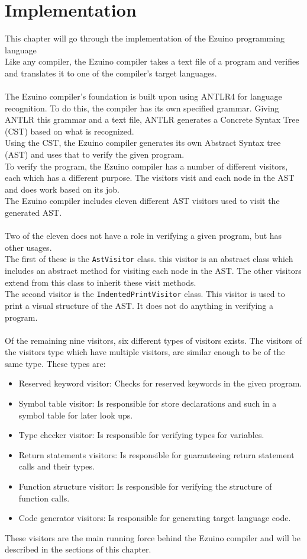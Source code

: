 \chapter{Implementation}
This chapter will go through the implementation of the Ezuino programming language\\
Like any compiler, the Ezuino compiler takes a text file of a program and verifies and translates it to one of the compiler’s target languages.
\\\\
The Ezuino compiler’s foundation is built upon using ANTLR4 for language recognition. To do this, the compiler has its own specified grammar. Giving ANTLR this grammar and a text file, ANTLR generates a Concrete Syntax Tree (CST) based on what is recognized.\\
Using the CST, the Ezuino compiler generates its own Abstract Syntax tree (AST) and uses that to verify the given program.\\
To verify the program, the Ezuino compiler has a number of different visitors, each which has a different purpose. The visitors visit and each node in the AST and does work based on its job.\\
The Ezuino compiler includes eleven different AST visitors used to visit the generated AST.
\\\\
Two of the eleven does not have a role in verifying a given program, but has other usages.\\
The first of these is the \texttt{AstVisitor} class. this visitor is an abstract class which includes an abstract method for visiting each node in the AST. The other visitors extend from this class to inherit these visit methods.\\
The second visitor is the \texttt{IndentedPrintVisitor} class. This visitor is used to print a visual structure of the AST. It does not do anything in verifying a program.
\\\\
Of the remaining nine visitors, six different types of visitors exists. The visitors of the visitors type which have multiple visitors, are similar enough to be of the same type. These types are:
\begin{itemize}
    \setlength\itemsep{0.3em}
    \item Reserved keyword visitor: Checks for reserved keywords in the given program.
    \item Symbol table visitor: Is responsible for store declarations and such in a symbol table for later look ups.
    \item Type checker visitor: Is responsible for verifying types for variables.
    \item Return statements visitors: Is responsible for guaranteeing return statement calls and their types.
    \item Function structure visitor: Is responsible for verifying the structure of function calls.
    \item Code generator visitors: Is responsible for generating target language code.
\end{itemize}
These visitors are the main running force behind the Ezuino compiler and will be described in the sections of this chapter.
